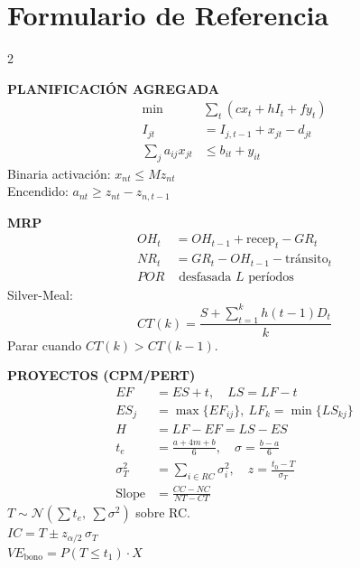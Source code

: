 \section{Formulario de Referencia}

\begin{multicols}{2}
\small

\textbf{\color{gopblue} PLANIFICACIÓN AGREGADA}
\begin{align*}
  \min &\textstyle\sum_t (c x_t + h I_t + f y_t)\\
  I_{jt} &= I_{j,t-1} + x_{jt} - d_{jt}\\
  \textstyle\sum_j a_{ij}x_{jt} &\le b_{it} + y_{it}
\end{align*}
Binaria activación: $x_{nt}\le M z_{nt}$\\
Encendido: $a_{nt}\ge z_{nt}-z_{n,t-1}$

\textbf{\color{gopblue} MRP}
\begin{align*}
  OH_t &= OH_{t-1} + \text{recep}_t - GR_t\\
  NR_t &= GR_t - OH_{t-1} - \text{tránsito}_t\\
  POR &\text{ desfasada } L \text{ períodos}
\end{align*}
Silver-Meal:
\[
  CT(k) = \frac{S + \sum_{t=1}^{k} h(t-1)D_t}{k}
\]
Parar cuando $CT(k)>CT(k-1)$.

\textbf{\color{gopblue} PROYECTOS (CPM/PERT)}
\begin{align*}
  EF &= ES + t,\quad LS = LF - t\\
  ES_j &= \max\{EF_{ij}\},\ LF_k = \min\{LS_{kj}\}\\
  H &= LF - EF = LS - ES\\
  t_e &= \tfrac{a+4m+b}{6},\quad \sigma = \tfrac{b-a}{6}\\
  \sigma_T^2 &= \textstyle\sum_{i\in RC}\sigma_i^2,\quad z = \tfrac{t_0 - T}{\sigma_T}\\
  \text{Slope} &= \tfrac{CC - NC}{NT - CT}
\end{align*}
$T \sim \mathcal{N}(\sum t_e,\ \sum\sigma^2)$ sobre RC.\\
$IC = T \pm z_{\alpha/2}\,\sigma_T$\\
$VE_{\text{bono}} = P(T\le t_1)\cdot X$

\columnbreak


\end{multicols}
